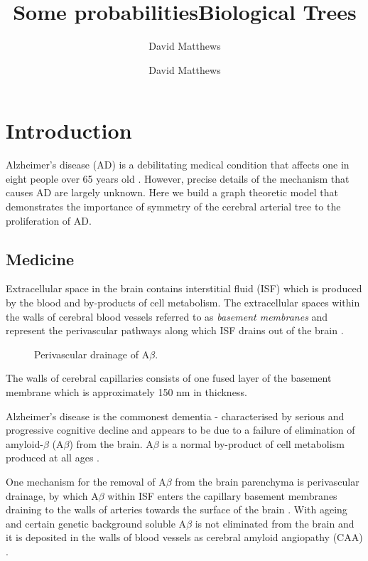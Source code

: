 \documentclass[12pt]{article} %
\title{Some probabilities}
\author{David Matthews}
\theoremstyle{definition}
\begin{document}
\title{Biological Trees}
\author{David Matthews}

\section{Introduction}
Alzheimer's disease (AD) is a debilitating medical condition that affects one in eight people over 65 years old \cite{Bengt}.  However, precise details of the mechanism that causes AD are largely unknown.  Here we build a graph theoretic model that demonstrates the importance of symmetry of the cerebral arterial tree to the proliferation of AD.


\subsection{Medicine}

Extracellular space in the brain contains interstitial fluid (ISF) which is produced by the blood and by-products of cell metabolism.  The extracellular spaces within the walls of cerebral blood vessels referred to as \emph{basement membranes} and represent the perivascular pathways along which ISF drains out of the brain \cite{wellerperi,wellermicro,Rox}.  

\begin{figure}[H]

              \centering
                \caption{Perivascular drainage of A$\beta$.}
\end{figure}

The walls of cerebral capillaries consists of one fused layer of  the basement membrane which is approximately 150 nm in thickness.  

Alzheimer's disease is the commonest dementia - characterised by serious and progressive cognitive decline and appears to be due to a failure of elimination of amyloid-$\beta$ (A$\beta$) from the brain.  A$\beta$ is a normal by-product of cell metabolism produced at all ages \cite{}.

One mechanism for the removal of A$\beta$ from the brain parenchyma is perivascular drainage, by which A$\beta$ within ISF enters the capillary basement membranes draining to the walls of arteries towards the surface of the brain \cite{Rox}\cite{wellerperi}.  With ageing and certain genetic background soluble A$\beta$ is not eliminated from the brain and it is deposited in the walls of blood vessels as cerebral amyloid angiopathy (CAA) \cite{Lowe}.  
\end{document}
